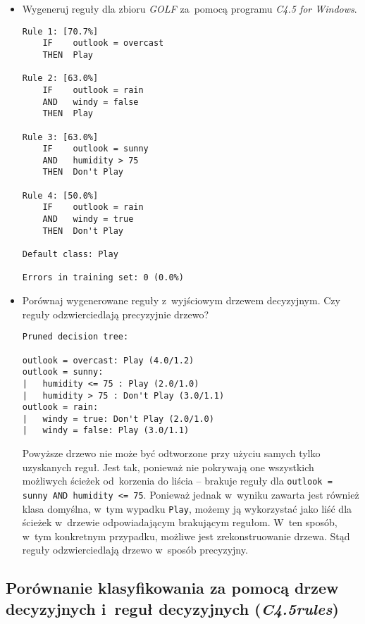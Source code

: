 \documentclass{article}
\begin{document}
\begin{itemize}
\item Wygeneruj reguły dla zbioru \emph{GOLF} za~pomocą programu \emph{C4.5 for Windows}.


\begin{verbatim}
Rule 1: [70.7%]
    IF    outlook = overcast
    THEN  Play

Rule 2: [63.0%]
    IF    outlook = rain
    AND   windy = false
    THEN  Play

Rule 3: [63.0%]
    IF    outlook = sunny
    AND   humidity > 75
    THEN  Don't Play

Rule 4: [50.0%]
    IF    outlook = rain
    AND   windy = true
    THEN  Don't Play

Default class: Play

Errors in training set: 0 (0.0%)
\end{verbatim}

\item Porównaj wygenerowane reguły z~wyjściowym drzewem decyzyjnym. Czy reguły odzwierciedlają precyzyjnie drzewo?

\begin{verbatim}
Pruned decision tree:

outlook = overcast: Play (4.0/1.2)
outlook = sunny:
|   humidity <= 75 : Play (2.0/1.0)
|   humidity > 75 : Don't Play (3.0/1.1)
outlook = rain:
|   windy = true: Don't Play (2.0/1.0)
|   windy = false: Play (3.0/1.1)
\end{verbatim}

Powyższe drzewo nie może być odtworzone przy użyciu samych tylko uzyskanych reguł. Jest tak, ponieważ nie pokrywają one wszystkich możliwych ścieżek od~korzenia do liścia -- brakuje reguły dla \texttt{outlook = sunny AND humidity <= 75}. Ponieważ jednak w~wyniku zawarta jest również klasa domyślna, w~tym wypadku \texttt{Play}, możemy ją wykorzystać jako liść dla ścieżek w~drzewie odpowiadającym brakującym regułom. W~ten sposób, w~tym konkretnym przypadku, możliwe jest zrekonstruowanie drzewa. Stąd reguły odzwierciedlają drzewo w~sposób precyzyjny.
\end{itemize}

\subsection{Porównanie klasyfikowania za pomocą drzew decyzyjnych i~reguł decyzyjnych (\emph{C4.5rules})}
\end{document}
